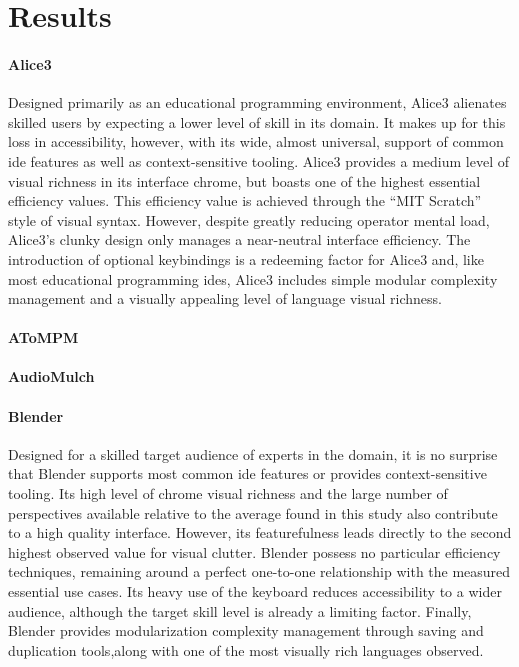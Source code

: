 \section{Results}
\label{sec:results}


\paragraph{Alice3} Designed primarily as an educational programming
environment, Alice3 alienates skilled users by expecting a lower level of
skill in its domain. It makes up for this loss in accessibility, however,
with its wide, almost universal, support of common \ac{ide} features as
well as context-sensitive tooling. Alice3 provides a medium level of visual
richness in its interface chrome, but boasts one of the highest essential
efficiency values. This efficiency value is achieved through the ``MIT
Scratch'' style of visual syntax. However, despite greatly reducing
operator mental load, Alice3's clunky design only manages a near-neutral
interface efficiency. The introduction of optional keybindings is a
redeeming factor for Alice3 and, like most educational programming
\acp{ide}, Alice3 includes simple modular complexity management and a
visually appealing level of language visual richness.

\paragraph{AToMPM}

\paragraph{AudioMulch}

\paragraph{Blender} Designed for a skilled target audience of experts in
the domain, it is no surprise that Blender supports most common \ac{ide}
features or provides context-sensitive tooling. Its high level of chrome
visual richness and the large number of perspectives available relative to
the average found in this study also contribute to a high quality
interface. However, its featurefulness leads directly to the second highest
observed value for visual clutter. Blender possess no particular efficiency
techniques, remaining around a perfect one-to-one relationship with the
measured essential use cases. Its heavy use of the keyboard reduces
accessibility to a wider audience, although the target skill level is
already a limiting factor. Finally, Blender provides modularization
complexity management through saving and duplication tools,along with one
of the most visually rich languages observed.

